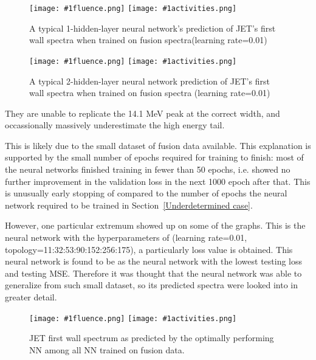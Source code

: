 \documentclass[a4paper, 12pt]{article}
\newcommand{\fluenceandactivities}[1]{
\texttt{[image: \#1fluence.png]}
\texttt{[image: \#1activities.png]}
}
\begin{document}
\begin{figure}[H]
\centering
\fluenceandactivities{/home/ocean/Documents/GitHubDir/unfolding/unfolding/unfoldingsuite/neuralnetwork/realoutputEarlyStopping/SelectedNNreplicated/fusion-fusion-final/0926_1933_1_layerfinal_investigation_1_test_001_}
\caption{A typical 1-hidden-layer neural network's prediction of JET's first wall spectra when trained on fusion spectra(learning rate=0.01)}
\end{figure}

\begin{figure}
\centering
\fluenceandactivities{/home/ocean/Documents/GitHubDir/unfolding/unfolding/unfoldingsuite/neuralnetwork/realoutputEarlyStopping/SelectedNNreplicated/fusion-fusion/0918_0332_2_layer_typical_mse_including_folded_test_001_}
\caption{A typical 2-hidden-layer neural network prediction of JET's first wall spectra when trained on fusion spectra (learning rate=0.01)}\label{3Layerfusion-fusionJET-FW}
\end{figure}

They are unable to replicate the 14.1 MeV peak at the correct width, and occassionally massively underestimate the high energy tail.

This is likely due to the small dataset of fusion data available. This explanation is supported by the small number of epochs required for training to finish: most of the neural networks finished training in fewer than 50 epochs, i.e. showed no further improvement in the validation loss in the next 1000 epoch after that. This is unusually early stopping of compared to the number of epochs the neural network required to be trained in Section~\ref{Underdetermined case}.

However, one particular extremum showed up on some of the graphs. This is the neural network with the hyperparameters of (learning rate=0.01, topology=11:32:53:90:152:256:175), a particularly loss value is obtained. This neural network is found to be as the neural network with the lowest testing loss and testing MSE. Therefore it was thought that the neural network was able to generalize from such small dataset, so its predicted spectra were looked into in greater detail.

\begin{figure}[H]
\centering
\fluenceandactivities{/home/ocean/Documents/GitHubDir/unfolding/unfolding/unfoldingsuite/neuralnetwork/realoutputEarlyStopping/SelectedNNreplicated/fusion-fusion/0918_0332_5_layer_top_right_anomaly_test_001_}
\caption{JET first wall spectrum as predicted by the optimally performing NN among all NN trained on fusion data.}\label{5Layerfusion-fusionJET-FW}
\end{figure}
\end{document}
